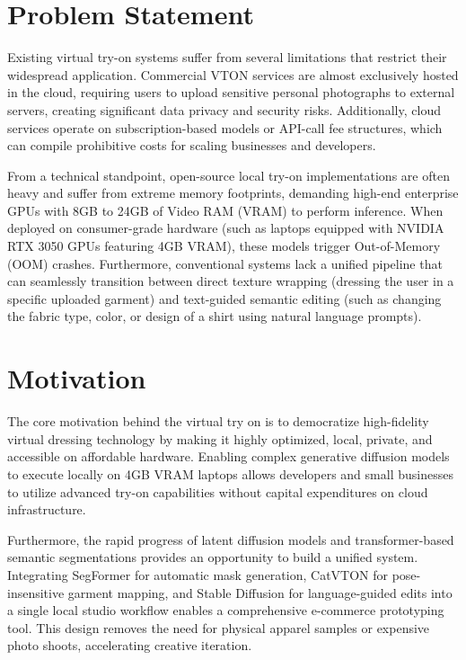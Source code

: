 \documentclass[12pt, a4paper]{report}
\begin{document}
\section{Problem Statement}

Existing virtual try-on systems suffer from several limitations that restrict their widespread application. Commercial VTON services are almost exclusively hosted in the cloud, requiring users to upload sensitive personal photographs to external servers, creating significant data privacy and security risks. Additionally, cloud services operate on subscription-based models or API-call fee structures, which can compile prohibitive costs for scaling businesses and developers.

From a technical standpoint, open-source local try-on implementations are often heavy and suffer from extreme memory footprints, demanding high-end enterprise GPUs with 8GB to 24GB of Video RAM (VRAM) to perform inference. When deployed on consumer-grade hardware (such as laptops equipped with NVIDIA RTX 3050 GPUs featuring 4GB VRAM), these models trigger Out-of-Memory (OOM) crashes. Furthermore, conventional systems lack a unified pipeline that can seamlessly transition between direct texture wrapping (dressing the user in a specific uploaded garment) and text-guided semantic editing (such as changing the fabric type, color, or design of a shirt using natural language prompts).

\section{Motivation}

The core motivation behind the virtual try on is to democratize high-fidelity virtual dressing technology by making it highly optimized, local, private, and accessible on affordable hardware. Enabling complex generative diffusion models to execute locally on 4GB VRAM laptops allows developers and small businesses to utilize advanced try-on capabilities without capital expenditures on cloud infrastructure.

Furthermore, the rapid progress of latent diffusion models and transformer-based semantic segmentations provides an opportunity to build a unified system. Integrating SegFormer for automatic mask generation, CatVTON for pose-insensitive garment mapping, and Stable Diffusion for language-guided edits into a single local studio workflow enables a comprehensive e-commerce prototyping tool. This design removes the need for physical apparel samples or expensive photo shoots, accelerating creative iteration.
\end{document}
